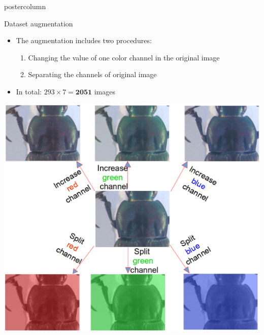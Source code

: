 \begin{frame}
\begin{columns}
\begin{column}{.49\textwidth}
\begin{beamercolorbox}[center,wd=\textwidth]{postercolumn}
\begin{minipage}[T]{.95\textwidth}
{            \vfill
            
            \begin{block}{Dataset augmentation}
            	\begin{itemize}
            		\item[] The augmentation includes two procedures:
            			\begin{enumerate}
            				\item Changing the value of one color channel in the original image
            				\item Separating the channels of original image	
			           	\end{enumerate}
					\item[] In total: $293 \times 7 = \textbf{2051}$ images 
            	\end{itemize}
            \centering
            
            \includegraphics[width=.6\textwidth]{images/data_aug.eps}
            \end{block}
            
            \vfill
            
}
\end{minipage}
\end{beamercolorbox}
\end{column}
\end{columns}
\end{frame}
